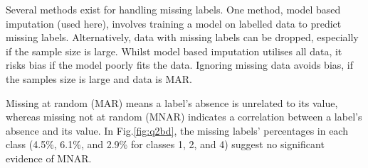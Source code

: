     Several methods exist for handling missing labels.
    One method, model based imputation (used here), involves training a model on labelled data to predict missing labels.
    Alternatively, data with missing labels can be dropped, especially if the sample size is large.
    Whilst model based imputation utilises all data, it risks bias if the model poorly fits the data.
    Ignoring missing data avoids bias, if the samples size is large and data is MAR.

    Missing at random (MAR) means a label's absence is unrelated to its value, whereas missing not at random (MNAR)
    indicates a correlation between a label's absence and its value.
    In Fig.\eqref{fig:q2bd}, the missing labels' percentages in each class (4.5\%, 6.1\%, and 2.9\% for classes 1, 2,
    and 4) suggest no significant evidence of MNAR.
